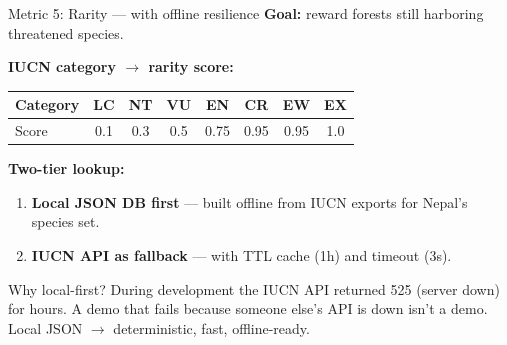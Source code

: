 \documentclass[aspectratio=169]{beamer}
\begin{document}
\begin{frame}{Metric 5: Rarity --- with offline resilience}
  \textbf{Goal:} reward forests still harboring threatened species.
  \vspace{0.4em}

  \textbf{IUCN category $\rightarrow$ rarity score:}
  \begin{center}
  \small
  \begin{tabular}{lccccccc}
    \toprule
    Category & LC & NT & VU & EN & CR & EW & EX \\
    \midrule
    Score    & 0.1 & 0.3 & 0.5 & 0.75 & 0.95 & 0.95 & 1.0 \\
    \bottomrule
  \end{tabular}
  \end{center}
  \vspace{0.5em}
  \textbf{Two-tier lookup:}
  \begin{enumerate}
    \item \textbf{Local JSON DB first} --- built offline from IUCN exports for Nepal's species set.
    \item \textbf{IUCN API as fallback} --- with TTL cache (1h) and timeout (3s).
  \end{enumerate}
  \vspace{0.4em}
  \begin{alertblock}{Why local-first?}
    During development the IUCN API returned 525 (server down) for hours. A demo that fails because someone else's API is down isn't a demo. Local JSON $\rightarrow$ deterministic, fast, offline-ready.
  \end{alertblock}
\end{frame}
\end{document}
